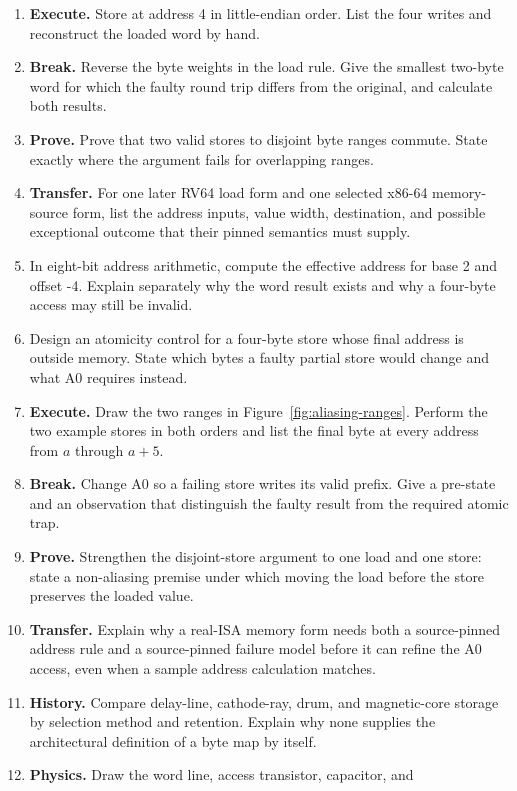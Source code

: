 \begin{enumerate}
\item \textbf{Execute.} Store  at address 4 in little-endian
order. List the four writes and reconstruct the loaded word by hand.
\item \textbf{Break.} Reverse the byte weights in the load rule. Give the
smallest two-byte word for which the faulty round trip differs from the
original, and calculate both results.
\item \textbf{Prove.} Prove that two valid stores to disjoint byte ranges
commute. State exactly where the argument fails for overlapping ranges.
\item \textbf{Transfer.} For one later RV64 load form and one selected x86-64
memory-source form, list the address inputs, value width, destination, and
possible exceptional outcome that their pinned semantics must supply.
\item In eight-bit address arithmetic, compute the effective address for base
2 and offset -4. Explain separately why the word result exists and why a
four-byte access may still be invalid.
\item Design an atomicity control for a four-byte store whose final address is
outside memory. State which bytes a faulty partial store would change and what
A0 requires instead.
\item \textbf{Execute.} Draw the two ranges in
Figure~\ref{fig:aliasing-ranges}. Perform the two example stores in both
orders and list the final byte at every address from \(a\) through \(a+5\).
\item \textbf{Break.} Change A0 so a failing store writes its valid prefix.
Give a pre-state and an observation that distinguish the faulty result from
the required atomic trap.
\item \textbf{Prove.} Strengthen the disjoint-store argument to one load and
one store: state a non-aliasing premise under which moving the load before the
store preserves the loaded value.
\item \textbf{Transfer.} Explain why a real-ISA memory form needs both a
source-pinned address rule and a source-pinned failure model before it can
refine the A0 access, even when a sample address calculation matches.
\item \textbf{History.} Compare delay-line, cathode-ray, drum, and magnetic-core
storage by selection method and retention. Explain why none supplies the
architectural definition of a byte map by itself.
\item \textbf{Physics.} Draw the word line, access transistor, capacitor, and

\end{enumerate}
